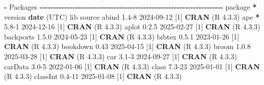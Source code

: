 \documentclass[
]{article}
\newenvironment{Shaded}{\begin{snugshade}}{\end{snugshade}}
\newcommand{\DecValTok}[1]{\textcolor[rgb]{0.00,0.00,0.81}{#1}}
\newcommand{\FloatTok}[1]{\textcolor[rgb]{0.00,0.00,0.81}{#1}}
\newcommand{\FunctionTok}[1]{\textcolor[rgb]{0.13,0.29,0.53}{\textbf{#1}}}
\newcommand{\NormalTok}[1]{#1}
\newcommand{\SpecialCharTok}[1]{\textcolor[rgb]{0.81,0.36,0.00}{\textbf{#1}}}
\begin{document}
\begin{Shaded}
\begin{Highlighting}[]
\SpecialCharTok{{-}}\NormalTok{ Packages }\SpecialCharTok{{-}{-}{-}{-}{-}{-}{-}{-}{-}{-}{-}{-}{-}{-}{-}{-}{-}{-}{-}{-}{-}{-}{-}{-}{-}{-}{-}{-}{-}{-}{-}{-}{-}{-}{-}{-}{-}{-}{-}{-}{-}{-}{-}{-}{-}{-}{-}{-}{-}{-}{-}{-}{-}{-}{-}{-}{-}{-}{-}{-}{-}{-}{-}{-}{-}{-}{-}}
\NormalTok{ package       }\SpecialCharTok{*}\NormalTok{ version }\FunctionTok{date}\NormalTok{ (UTC) lib source}
\NormalTok{ abind           }\FloatTok{1.4}\DecValTok{{-}8}   \DecValTok{2024{-}09{-}12}\NormalTok{ [}\DecValTok{1}\NormalTok{] }\FunctionTok{CRAN}\NormalTok{ (R }\DecValTok{4}\NormalTok{.}\FloatTok{3.3}\NormalTok{)}
\NormalTok{ ape           }\SpecialCharTok{*} \FloatTok{5.8}\DecValTok{{-}1}   \DecValTok{2024{-}12{-}16}\NormalTok{ [}\DecValTok{1}\NormalTok{] }\FunctionTok{CRAN}\NormalTok{ (R }\DecValTok{4}\NormalTok{.}\FloatTok{3.3}\NormalTok{)}
\NormalTok{ aplot           }\DecValTok{0}\NormalTok{.}\FloatTok{2.5}   \DecValTok{2025{-}02{-}27}\NormalTok{ [}\DecValTok{1}\NormalTok{] }\FunctionTok{CRAN}\NormalTok{ (R }\DecValTok{4}\NormalTok{.}\FloatTok{3.3}\NormalTok{)}
\NormalTok{ backports       }\DecValTok{1}\NormalTok{.}\FloatTok{5.0}   \DecValTok{2024{-}05{-}23}\NormalTok{ [}\DecValTok{1}\NormalTok{] }\FunctionTok{CRAN}\NormalTok{ (R }\DecValTok{4}\NormalTok{.}\FloatTok{3.3}\NormalTok{)}
\NormalTok{ bibtex          }\DecValTok{0}\NormalTok{.}\FloatTok{5.1}   \DecValTok{2023{-}01{-}26}\NormalTok{ [}\DecValTok{1}\NormalTok{] }\FunctionTok{CRAN}\NormalTok{ (R }\DecValTok{4}\NormalTok{.}\FloatTok{3.3}\NormalTok{)}
\NormalTok{ bookdown        }\FloatTok{0.43}    \DecValTok{2025{-}04{-}15}\NormalTok{ [}\DecValTok{1}\NormalTok{] }\FunctionTok{CRAN}\NormalTok{ (R }\DecValTok{4}\NormalTok{.}\FloatTok{3.3}\NormalTok{)}
\NormalTok{ broom           }\DecValTok{1}\NormalTok{.}\FloatTok{0.8}   \DecValTok{2025{-}03{-}28}\NormalTok{ [}\DecValTok{1}\NormalTok{] }\FunctionTok{CRAN}\NormalTok{ (R }\DecValTok{4}\NormalTok{.}\FloatTok{3.3}\NormalTok{)}
\NormalTok{ car             }\FloatTok{3.1}\DecValTok{{-}3}   \DecValTok{2024{-}09{-}27}\NormalTok{ [}\DecValTok{1}\NormalTok{] }\FunctionTok{CRAN}\NormalTok{ (R }\DecValTok{4}\NormalTok{.}\FloatTok{3.3}\NormalTok{)}
\NormalTok{ carData         }\FloatTok{3.0}\DecValTok{{-}5}   \DecValTok{2022{-}01{-}06}\NormalTok{ [}\DecValTok{1}\NormalTok{] }\FunctionTok{CRAN}\NormalTok{ (R }\DecValTok{4}\NormalTok{.}\FloatTok{3.3}\NormalTok{)}
\NormalTok{ class           }\FloatTok{7.3}\DecValTok{{-}23}  \DecValTok{2025{-}01{-}01}\NormalTok{ [}\DecValTok{1}\NormalTok{] }\FunctionTok{CRAN}\NormalTok{ (R }\DecValTok{4}\NormalTok{.}\FloatTok{3.3}\NormalTok{)}
\NormalTok{ classInt        }\FloatTok{0.4}\DecValTok{{-}11}  \DecValTok{2025{-}01{-}08}\NormalTok{ [}\DecValTok{1}\NormalTok{] }\FunctionTok{CRAN}\NormalTok{ (R }\DecValTok{4}\NormalTok{.}\FloatTok{3.3}\NormalTok{)}

\end{Highlighting}
\end{Shaded}
\end{document}
